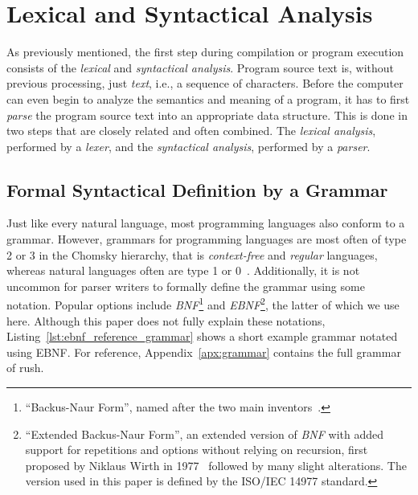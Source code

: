 \section{Lexical and Syntactical Analysis}

As previously mentioned, the first step during compilation or program execution consists of the \emph{lexical} and \emph{syntactical analysis}.
Program source text is, without previous processing, just \emph{text}, i.e., a sequence of characters.
Before the computer can even begin to analyze the semantics and meaning of a program, it has to first \emph{parse} the program source text into an appropriate data structure.
This is done in two steps that are closely related and often combined.
The \emph{lexical analysis}, performed by a \emph{lexer}, and the \emph{syntactical analysis}, performed by a \emph{parser}.

\subsection{Formal Syntactical Definition by a Grammar}

Just like every natural language, most programming languages also conform to a grammar.
However, grammars for programming languages are most often of type 2 or 3 in the Chomsky hierarchy, that is \emph{context-free} and \emph{regular} languages, whereas natural languages often are type 1 or 0~\cite[p.~24]{Watson2017}.
Additionally, it is not uncommon for parser writers to formally define the grammar using some notation.
Popular options include \emph{BNF}\footnote{\enquote{Backus-Naur Form}, named after the two main inventors~\cite{Backus1960}.} and \emph{EBNF}\footnote{\enquote{Extended Backus-Naur Form}, an extended version of \emph{BNF} with added support for repetitions and options without relying on recursion, first proposed by Niklaus Wirth in 1977~\cite{Wirth1977} followed by many slight alterations. The version used in this paper is defined by the ISO/IEC 14977 standard.}, the latter of which we use here.
Although this paper does not fully explain these notations, Listing~\ref{lst:ebnf_reference_grammar} shows a short example grammar notated using EBNF.
For reference, Appendix~\ref{apx:grammar} contains the full grammar of rush.


